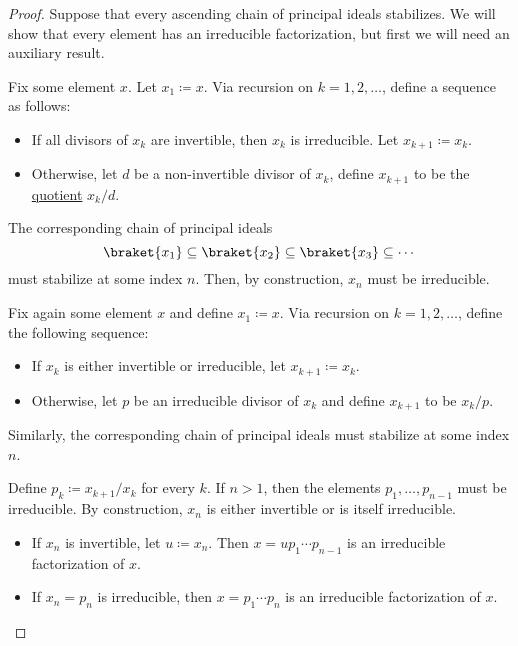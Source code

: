 \begin{proof}
   Suppose that every ascending chain of principal ideals stabilizes. We will show that every element has an irreducible factorization, but first we will need an auxiliary result.

   Fix some element \( x \). Let \( x_1 \coloneqq x \). Via recursion on \( k = 1, 2, \ldots \), define a sequence as follows:
  \begin{itemize}
    \item If all divisors of \( x_k \) are invertible, then \( x_k \) is irreducible. Let \( x_{k+1} \coloneqq x_k \).
    \item Otherwise, let \( d \) be a non-invertible divisor of \( x_k \), define \( x_{k+1} \) to be the \hyperref[def:domain_quotient]{quotient} \( x_k / d \).
  \end{itemize}

  The corresponding chain of principal ideals
  \begin{equation*}
    \braket{ x_1 } \subseteq \braket{ x_2 } \subseteq \braket{ x_3 } \subseteq \cdots
  \end{equation*}
  must stabilize at some index \( n \). Then, by construction, \( x_n \) must be irreducible.

   Fix again some element \( x \) and define \( x_1 \coloneqq x \). Via recursion on \( k = 1, 2, \ldots \), define the following sequence:
  \begin{itemize}
    \item If \( x_k \) is either invertible or irreducible, let \( x_{k+1} \coloneqq x_k \).
    \item Otherwise, let \( p \) be an irreducible divisor of \( x_k \) and define \( x_{k+1} \) to be \( x_k / p \).
  \end{itemize}

  Similarly, the corresponding chain of principal ideals must stabilize at some index \( n \).

  Define \( p_k \coloneqq x_{k+1} / x_k \) for every \( k \). If \( n > 1 \), then the elements \( p_1, \ldots, p_{n-1} \) must be irreducible. By construction, \( x_n \) is either invertible or is itself irreducible.
  \begin{itemize}
    \item If \( x_n \) is invertible, let \( u \coloneqq x_n \). Then \( x = u p_1 \cdots p_{n-1} \) is an irreducible factorization of \( x \).
    \item If \( x_n = p_n \) is irreducible, then \( x = p_1 \cdots p_n \) is an irreducible factorization of \( x \).
  \end{itemize}


\end{proof}
